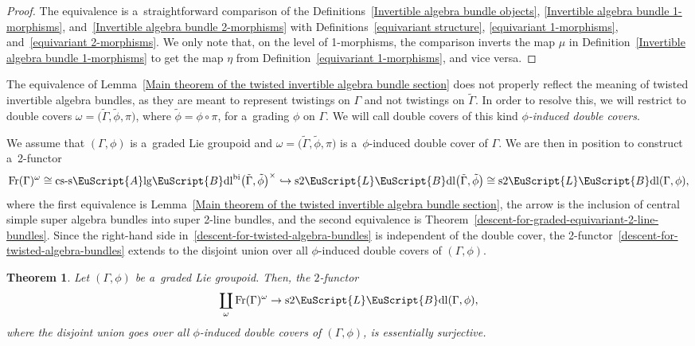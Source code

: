 \documentclass[pdftex]{sigma}
\numberwithin{equation}{section}
\newtheorem{Theorem}{Theorem}[section]
\def\mathscr#1{\EuScript{#1}}
\newcommand{\incl}{\hookrightarrow}
\newcommand{\LineBdl}{\mathscr{L}\mathscr{B}\mathrm{dl}}
\newcommand{\stwoLineBdl}{\mathrm{s}2\LineBdl}
\newcommand{\Alg}{\Incl\mathrm{lg}}
\newcommand{\cssAlg}{\mathrm{cs\text{-}s}\Alg}
\newcommand{\cssAlgBdlbi}{\cssAlg\mathscr{B}\mathrm{dl}^{\mathrm{bi}}}
\newcommand{\Incl}{\mathscr{A}}
\begin{document}
\begin{proof}
 The equivalence is a~straightforward comparison of the Definitions~\ref{Invertible algebra bundle objects},
 \ref{Invertible algebra bundle 1-morphisms}, and~\ref{Invertible algebra bundle 2-morphisms} with Definitions~\ref{equivariant structure}, \ref{equivariant 1-morphisms}, and~\ref{equivariant 2-morphisms}. We only note that, on the level of 1-morphisms,
 the comparison inverts the map $\mu$ in Definition~\ref{Invertible algebra bundle 1-morphisms} to get the map $\eta$
 from Definition~\ref{equivariant 1-morphisms}, and vice versa.
\end{proof}


The equivalence of Lemma~\ref{Main theorem of the twisted invertible algebra bundle section} does not properly reflect the meaning of twisted invertible algebra bundles, as they are meant to represent twistings on $\Gamma$ and not twistings on $\tilde\Gamma$.
In order to resolve this, we will restrict to double covers $\omega=\bigl(\tilde\Gamma,\tilde\phi,\pi\bigr)$, where $\tilde\phi=\phi \circ \pi$, for a~grading $\phi$ on $\Gamma$.
We will call double covers of this kind \emph{$\phi$-induced double covers}.

We assume that $(\Gamma,\phi)$ is a~graded Lie groupoid and $\omega=\bigl(\tilde\Gamma,\tilde\phi,\pi\bigr)$ is a~$\phi$-induced double cover of $\Gamma$. We are then in position to construct a~2-functor
\begin{equation}
\label{descent-for-twisted-algebra-bundles}
\mathrm{Fr}(\Gamma)^{\omega} \cong \cssAlgBdlbi\bigl(\tilde \Gamma,\tilde \phi\bigr)^\times \incl \stwoLineBdl\bigl(\tilde \Gamma,\tilde \phi\bigr) \cong \stwoLineBdl(\Gamma,\phi),
\end{equation}
where the first equivalence is Lemma~\ref{Main theorem of the twisted invertible algebra bundle section}, the arrow is the inclusion of central simple super algebra bundles into super 2-line bundles, and the second equivalence is Theorem~\ref{descent-for-graded-equivariant-2-line-bundles}.
Since the right-hand side in~\eqref{descent-for-twisted-algebra-bundles} is independent of the double cover, the 2-functor~\eqref{descent-for-twisted-algebra-bundles} extends to the disjoint union over all $\phi$-induced double covers of $(\Gamma,\phi)$.

\begin{Theorem}
\label{freeds-invertible-algebra-bundles-comparison}
Let $(\Gamma,\phi)$ be a~graded Lie groupoid. Then, the $2$-functor
\begin{equation*}
\coprod_{\omega}\mathrm{Fr}(\Gamma)^{\omega}\to \stwoLineBdl(\Gamma,\phi),
\end{equation*}
where the disjoint union goes over all $\phi$-induced double covers of $(\Gamma,\phi)$,
is essentially surjective.
\end{Theorem}
\end{document}
